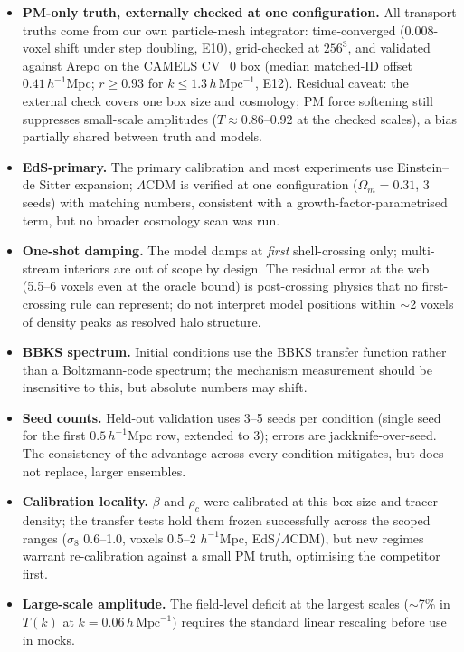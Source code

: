 \documentclass[11pt]{article}
\begin{document}
\begin{itemize}
\item \textbf{PM-only truth, externally checked at one configuration.} All transport truths come from our own particle-mesh integrator: time-converged (0.008-voxel shift under step doubling, E10), grid-checked at $256^3$, and validated against Arepo on the CAMELS CV\_0 box (median matched-ID offset $0.41\,h^{-1}$Mpc; $r \geq 0.93$ for $k \leq 1.3\,h\,\mathrm{Mpc}^{-1}$, E12). Residual caveat: the external check covers one box size and cosmology; PM force softening still suppresses small-scale amplitudes ($T \approx 0.86$--$0.92$ at the checked scales), a bias partially shared between truth and models.
\item \textbf{EdS-primary.} The primary calibration and most experiments use Einstein--de Sitter expansion; $\Lambda$CDM is verified at one configuration ($\Omega_m = 0.31$, 3 seeds) with matching numbers, consistent with a growth-factor-parametrised term, but no broader cosmology scan was run.
\item \textbf{One-shot damping.} The model damps at \emph{first} shell-crossing only; multi-stream interiors are out of scope by design. The residual error at the web (5.5--6 voxels even at the oracle bound) is post-crossing physics that no first-crossing rule can represent; do not interpret model positions within $\sim$2 voxels of density peaks as resolved halo structure.
\item \textbf{BBKS spectrum.} Initial conditions use the BBKS transfer function rather than a Boltzmann-code spectrum; the mechanism measurement should be insensitive to this, but absolute numbers may shift.
\item \textbf{Seed counts.} Held-out validation uses 3--5 seeds per condition (single seed for the first $0.5\,h^{-1}$Mpc row, extended to 3); errors are jackknife-over-seed. The consistency of the advantage across every condition mitigates, but does not replace, larger ensembles.
\item \textbf{Calibration locality.} $\beta$ and $\rho_c$ were calibrated at this box size and tracer density; the transfer tests hold them frozen successfully across the scoped ranges ($\sigma_8$ 0.6--1.0, voxels 0.5--2 $h^{-1}$Mpc, EdS/$\Lambda$CDM), but new regimes warrant re-calibration against a small PM truth, optimising the competitor first.
\item \textbf{Large-scale amplitude.} The field-level deficit at the largest scales ($\sim$7\% in $T(k)$ at $k = 0.06\,h\,\mathrm{Mpc}^{-1}$) requires the standard linear rescaling before use in mocks.
\end{itemize}
\end{document}
